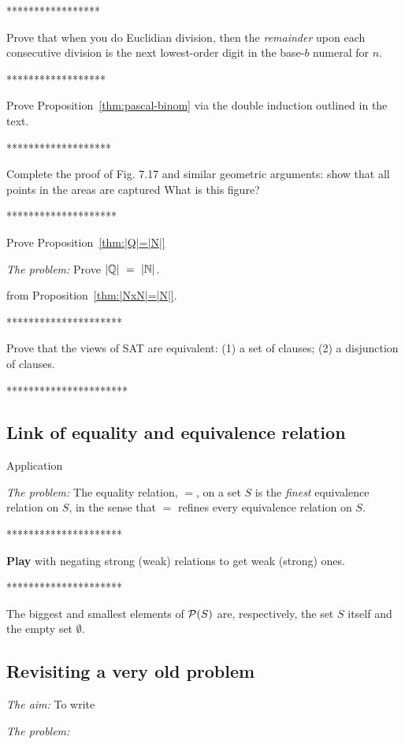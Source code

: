 *****************

Prove that when you do Euclidian division, then the {\em remainder}
upon each consecutive division is the next lowest-order digit in the
base-$b$ numeral for $n$.

******************

Prove Proposition~\ref{thm:pascal-binom} via the double induction
outlined in the text.


*******************

Complete the proof of Fig. 7.17 and similar geometric arguments: show
that all points in the areas are captured
{\Denis What is this figure?}

********************

Prove Proposition~\ref{thm:|Q|=|N|}

\noindent \textit{The problem:}
Prove $|\Q| \ = \ |\N|$.
\medskip

from Proposition~\ref{thm:|NxN|=|N|}.


*********************

Prove that the views of SAT are equivalent: (1) a set of clauses; (2)
a disjunction of clauses.


**********************

\subsection{Link of equality and equivalence relation}
Application

\noindent \textit{The problem:}
The equality relation, $=$, on a set $S$ is the {\em finest}
equivalence relation on $S$, in the sense that $=$ refines every
equivalence relation on $S$.
\medskip

*********************

\textbf{ Play} with negating strong (weak) relations to get weak (strong) ones.
 


*********************

 The biggest and smallest elements of
${\cal P}(S)$ are, respectively, the set $S$ itself and the empty set
$\emptyset$.

\subsection{Revisiting a very old problem}

\noindent \textit{The aim:}
To write
\medskip

\noindent \textit{The problem:}

